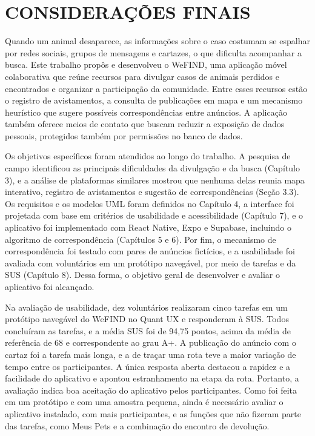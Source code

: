 \section{CONSIDERAÇÕES FINAIS}

Quando um animal desaparece, as informações sobre o caso costumam se espalhar por redes sociais, grupos de mensagens e cartazes, o que dificulta acompanhar a busca. Este trabalho propôs e desenvolveu o WeFIND, uma aplicação móvel colaborativa que reúne recursos para divulgar casos de animais perdidos e encontrados e organizar a participação da comunidade. Entre esses recursos estão o registro de avistamentos, a consulta de publicações em mapa e um mecanismo heurístico que sugere possíveis correspondências entre anúncios. A aplicação também oferece meios de contato que buscam reduzir a exposição de dados pessoais, protegidos também por permissões no banco de dados.

Os objetivos específicos foram atendidos ao longo do trabalho. A pesquisa de campo identificou as principais dificuldades da divulgação e da busca (Capítulo 3), e a análise de plataformas similares mostrou que nenhuma delas reunia mapa interativo, registro de avistamentos e sugestão de correspondências (Seção 3.3). Os requisitos e os modelos UML foram definidos no Capítulo 4, a interface foi projetada com base em critérios de usabilidade e acessibilidade (Capítulo 7), e o aplicativo foi implementado com React Native, Expo e Supabase, incluindo o algoritmo de correspondência (Capítulos 5 e 6). Por fim, o mecanismo de correspondência foi testado com pares de anúncios fictícios, e a usabilidade foi avaliada com voluntários em um protótipo navegável, por meio de tarefas e da SUS (Capítulo 8). Dessa forma, o objetivo geral de desenvolver e avaliar o aplicativo foi alcançado.

Na avaliação de usabilidade, dez voluntários realizaram cinco tarefas em um protótipo navegável do WeFIND no Quant UX e responderam à SUS. Todos concluíram as tarefas, e a média SUS foi de 94,75 pontos, acima da média de referência de 68 e correspondente ao grau A+. A publicação do anúncio com o cartaz foi a tarefa mais longa, e a de traçar uma rota teve a maior variação de tempo entre os participantes. A única resposta aberta destacou a rapidez e a facilidade do aplicativo e apontou estranhamento na etapa da rota. Portanto, a avaliação indica boa aceitação do aplicativo pelos participantes. Como foi feita em um protótipo e com uma amostra pequena, ainda é necessário avaliar o aplicativo instalado, com mais participantes, e as funções que não fizeram parte das tarefas, como Meus Pets e a combinação do encontro de devolução.

